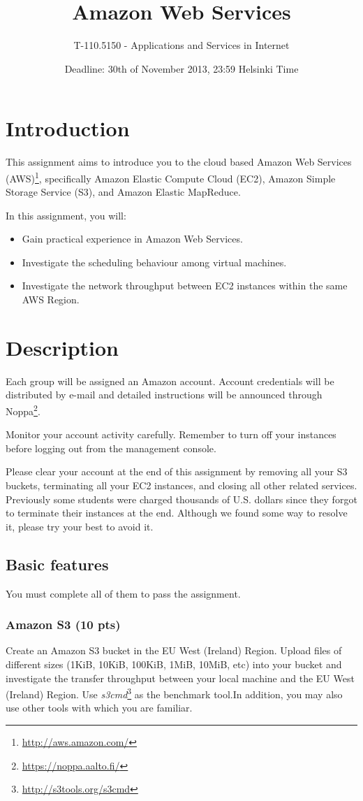 \documentclass[12pt, a4paper]{article}
\title{Amazon Web Services}
\author{T-110.5150 - Applications and Services in Internet}
\date{Deadline: 30th of November 2013, 23:59 Helsinki Time}
\begin{document}
\maketitle
\section{Introduction}

This assignment aims to introduce you to the cloud based Amazon Web Services (AWS)\footnote{\url{http://aws.amazon.com/}}, specifically Amazon Elastic Compute Cloud (EC2), Amazon Simple Storage Service (S3), and Amazon Elastic MapReduce.

In this assignment, you will:
\begin{itemize}
\item Gain practical experience in Amazon Web Services.
\item Investigate the scheduling behaviour among virtual machines.
\item Investigate the network throughput between EC2 instances within the same AWS Region.
\end{itemize}

\section{Description}
Each group will be assigned an Amazon account.
Account credentials will be distributed by e-mail and detailed instructions will be announced through Noppa\footnote{\url{https://noppa.aalto.fi/}}.

Monitor your account activity carefully.
Remember to turn off your instances before logging out from the management console.

Please clear your account at the end of this assignment by removing all your S3 buckets, terminating all your EC2 instances, and closing all other related services.
Previously some students were charged thousands of U.S. dollars since they forgot to terminate their instances at the end.
Although we found some way to resolve it, please try your best to avoid it.


\subsection{Basic features}
You must complete all of them to pass the assignment.

\subsubsection{Amazon S3 (10 pts)}
Create an Amazon S3 bucket in the EU West (Ireland) Region.
Upload files of different sizes (1KiB, 10KiB, 100KiB, 1MiB, 10MiB, etc) into your bucket and investigate the transfer throughput between your local machine and the EU West (Ireland) Region.
Use \emph{s3cmd}\footnote{\url{http://s3tools.org/s3cmd}} as the benchmark tool.In addition, you may also use other tools with which you are familiar.
\end{document}
